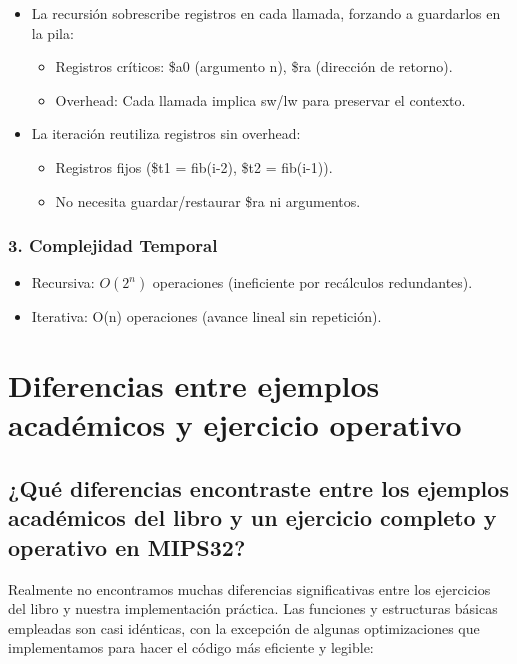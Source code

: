 \documentclass{article}
\begin{document}
\begin{itemize}[leftmargin=*]
    \item La recursión sobrescribe registros en cada llamada, forzando a guardarlos en la pila:
    \begin{itemize}
        \item Registros críticos: \$a0 (argumento n), \$ra (dirección de retorno).
        \item Overhead: Cada llamada implica sw/lw para preservar el contexto.
    \end{itemize}
    
    \item La iteración reutiliza registros sin overhead:
    \begin{itemize}
        \item Registros fijos (\$t1 = fib(i-2), \$t2 = fib(i-1)).
        \item No necesita guardar/restaurar \$ra ni argumentos.
    \end{itemize}
\end{itemize}

\subsubsection*{3. Complejidad Temporal}

\begin{itemize}[leftmargin=*]
    \item Recursiva: $O(2^n)$ operaciones (ineficiente por recálculos redundantes).
    \item Iterativa: O(n) operaciones (avance lineal sin repetición).
\end{itemize}

\section{Diferencias entre ejemplos académicos y ejercicio operativo}

\subsection{¿Qué diferencias encontraste entre los ejemplos académicos del libro y un ejercicio completo y operativo en MIPS32?}

Realmente no encontramos muchas diferencias significativas entre los ejercicios del libro y nuestra implementación práctica. Las funciones y estructuras básicas empleadas son casi idénticas, con la excepción de algunas optimizaciones que implementamos para hacer el código más eficiente y legible:
\end{document}
